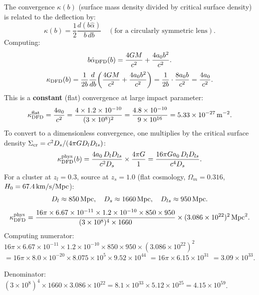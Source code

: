 \documentclass[11pt]{article}
\newcommand{\ee}[1]{\times 10^{#1}}
\newcommand{\azero}{a_0}
\newcommand{\DFD}{{\rm DFD}}
\begin{document}
The convergence $\kappa(b)$ (surface mass density divided by critical
surface density) is related to the deflection by:
\begin{equation}
  \kappa(b) = \frac{1}{2}\frac{d(b\hat\alpha)}{b\,db}
  \quad (\text{for a circularly symmetric lens}).
\end{equation}
Computing:
\begin{equation}
  b\hat\alpha_{\DFD}(b)
  = \frac{4GM}{c^2} + \frac{4\azero b^2}{c^2}.
\end{equation}
\begin{equation}\label{eq:kappa-dfd}
  \kappa_{\DFD}(b)
  = \frac{1}{2b}\frac{d}{db}\!\left(\frac{4GM}{c^2} + \frac{4\azero b^2}{c^2}\right)
  = \frac{1}{2b}\cdot\frac{8\azero b}{c^2}
  = \frac{4\azero}{c^2}.
\end{equation}
This is a \textbf{constant} (flat) convergence at large impact parameter:
\begin{equation}\label{eq:kappa-flat}
  \kappa_{\DFD}^{\rm flat}
  = \frac{4\azero}{c^2}
  = \frac{4\times 1.2\ee{-10}}{(3\ee{8})^2}
  = \frac{4.8\ee{-10}}{9\ee{16}}
  = 5.33\ee{-27}\,{\rm m}^{-2}.
\end{equation}
To convert to a dimensionless convergence, one multiplies by the
critical surface density $\Sigma_{\rm cr} = c^2 D_s/(4\pi G D_l D_{ls})$:
\begin{equation}\label{eq:kappa-physical}
  \kappa_{\DFD}^{\rm phys}(b)
  = \frac{4\azero\,D_l D_{ls}}{c^2 D_s}\times\frac{4\pi G}{1}
  = \frac{16\pi G\azero\,D_l D_{ls}}{c^4 D_s}.
\end{equation}
For a cluster at $z_l = 0.3$, source at $z_s = 1.0$
(flat cosmology, $\Omega_m = 0.316$, $H_0 = 67.4\,{\rm km/s/Mpc}$):
\[
  D_l \approx 850\,{\rm Mpc},\quad
  D_s \approx 1660\,{\rm Mpc},\quad
  D_{ls} \approx 950\,{\rm Mpc}.
\]
\begin{equation}
  \kappa_{\DFD}^{\rm phys}
  = \frac{16\pi\times 6.67\ee{-11}\times 1.2\ee{-10}
    \times 850\times 950}{(3\ee{8})^4\times 1660}
    \times(3.086\ee{22})^2\,{\rm Mpc}^2.
\end{equation}
Computing numerator:
$16\pi\times 6.67\ee{-11}\times 1.2\ee{-10}\times 850\times 950
\times (3.086\ee{22})^2$
$= 16\pi\times 8.0\ee{-20}\times 8.075\ee{5}
\times 9.52\ee{44}$
$= 16\pi\times 6.15\ee{31}$
$= 3.09\ee{33}$.

Denominator: $(3\ee{8})^4\times 1660\times 3.086\ee{22}
= 8.1\ee{33}\times 5.12\ee{25} = 4.15\ee{59}$.
\end{document}
